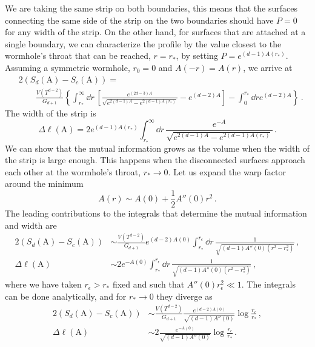 We are taking the same strip on both boundaries, this means that the surfaces connecting the same side of the strip on the two boundaries should have $P=0$ for any width of the strip.
On the other hand, for surfaces that are attached at a single boundary, we can characterize the profile by the value closest to the wormhole's throat that can be reached, $r=r_*$, by setting $P=e^{(d-1)A(r_*)}$.
Assuming a symmetric wormhole, $r_0=0$ and $A(-r)=A(r)$, we arrive at
\begin{align}\label{eq:mutualinfstrip}
	&2 \left(S_d(\text{A})-S_c(\text{A})\right)
	=\\ &\qquad \nonumber
	\frac{V(T^{d-2})}{G_{d+1}}\left\{\int_{r_*}^\infty \dd r\, \left[\frac{e^{(2d-3)A}}{\sqrt{e^{2(d-1)A}-e^{2(d-1)A(r_*)}}}-e^{(d-2)A}\right]-\int_0^{r_*}\dd r e^{(d-2)A} \right\}\,.
\end{align}
The width of the strip is
\begin{equation}\label{eq:widthstrip}
	\Delta \ell(\text{A})=2e^{(d-1)A(r_*)}\int_{r_*}^\infty \dd r\, \frac{e^{-A}}{\sqrt{e^{2(d-1)A}-e^{2(d-1)A(r_*)}}}\,.
\end{equation}
We can show that the mutual information grows as the volume when the width of the strip is large enough.
This happens when the disconnected surfaces approach each other at the wormhole's throat, $r_*\to 0$.
Let us expand the warp factor around the minimum
\begin{equation}
	A(r)\sim A(0)+\frac{1}{2}A''(0) r^2\,.
\end{equation}
The leading contributions to the integrals that determine the mutual information and width are
\begin{equation}
\begin{split}
	2 (S_d(\text{A})-S_c(\text{A})) &\sim \frac{V(T^{d-2})}{G_{d+1}}e^{(d-2)A(0)}\int_{r_*}^{r_\epsilon} \dd r\, \frac{1}{\sqrt{(d-1)A''(0)(r^2-r_*^2)}}
	\,,\\
	\Delta\ell(\text{A}) &\sim 2e^{-A(0)}\int_{r_*}^{r_\epsilon} \dd r\, \frac{1}{\sqrt{(d-1)A''(0)(r^2-r_*^2)}}\,,
\end{split}
\end{equation}
where we have taken $r_\epsilon>r_*$ fixed and such that $A''(0)r_\epsilon^2\ll 1$.
The integrals can be done analytically, and for $r_*\to 0$ they diverge as
\begin{equation}
\begin{split}
	2 (S_d(\text{A})-S_c(\text{A})) &\sim \frac{V(T^{d-2})}{G_{d+1}}\frac{e^{(d-2)A(0)}}{\sqrt{(d-1)A''(0)}}\log\frac{r_\epsilon}{r_*}
	\,,\\
	\Delta\ell(\text{A}) &\sim 2\frac{e^{-A(0)}}{\sqrt{(d-1)A''(0)}}\log\frac{r_\epsilon}{r_*}\,.
\end{split}
\end{equation}
